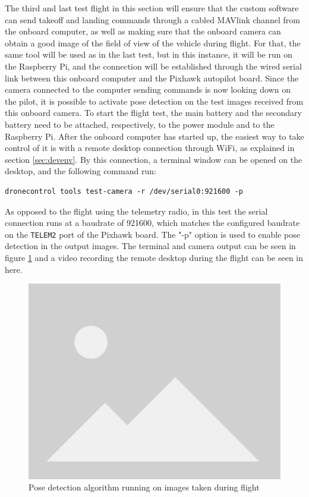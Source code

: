 The third and last test flight in this section will ensure that the custom software can send takeoff and landing commands through a cabled MAVlink channel from the onboard computer,
as well as making sure that the onboard camera can obtain a good image of the field of view of the vehicle during flight.
For that, the same tool will be used as in the last test, 
but in this instance, it will be run on the Raspberry Pi, and the connection will be established through the wired serial link between this onboard computer and the Pixhawk autopilot board.
Since the camera connected to the computer sending commands is now looking down on the pilot, it is possible to activate pose detection on the test images received from this onboard camera.
To start the flight test, the main battery and the secondary battery need to be attached, respectively, to the power module and to the Raspberry Pi.
After the onboard computer has started up, the easiest way to take control of it is with a remote desktop connection through WiFi, as explained in section \ref{sec:devenv}.
By this connection, a terminal window can be opened on the desktop, and the following command run:
\begin{verbatim}
dronecontrol tools test-camera -r /dev/serial0:921600 -p
\end{verbatim}
As opposed to the flight using the telemetry radio, in this test the serial connection runs at a baudrate of 921600, which matches the configured baudrate on the \texttt{TELEM2} port of the Pixhawk board.
The "-p" option is used to enable pose detection in the output images.
The terminal and camera output can be seen in figure \ref{fig:flight-test-cam-onboard} and a video recording the remote desktop during the flight can be seen in here.


\begin{figure}
  \centering
  \includegraphics[width=.6\textwidth, keepaspectratio]{img/placeholder.png}
  \caption{Pose detection algorithm running on images taken during flight}\label{fig:flight-test-cam-onboard}
\end{figure}


